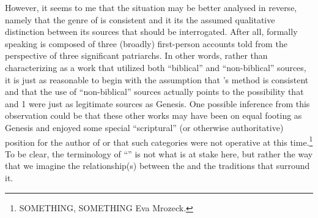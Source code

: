 However, it seems to me that the situation may be better analysed in reverse, namely that the genre of \ga is consistent and it its the assumed qualitative distinction between its sources that should be interrogated. After all, formally speaking \ga is composed of three (broadly) first-person accounts told from the perspective of three significant patriarchs. In other words, rather than characterizing \ga as a work that utilized both ``biblical'' and ``non-biblical'' sources, it is just as reasonable to begin with the assumption that \ga's method is consistent and that the use of ``non-biblical'' sources actually points to the possibility that \jub and 1 \enoch were just as legitimate sources as Genesis. One possible inference from this observation could be that these other works may have been on equal footing as Genesis and enjoyed some special ``scriptural'' (or otherwise authoritative) position for the author of \ga or that such categories were not operative at this time.\footnote{SOMETHING, SOMETHING Eva Mrozeck.} To be clear, the terminology of ``\rwb'' is not what is at stake here, but rather the way that we imagine the relationship(s) between the \ga and the traditions that surround it.

